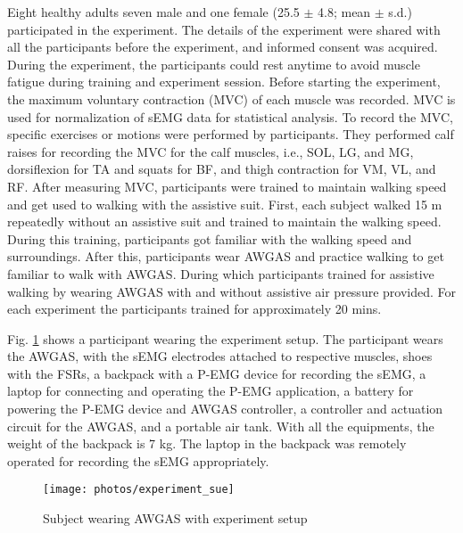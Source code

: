 \documentclass[paper,JRM,paper]{jaciiiarticle}
\begin{document}
Eight healthy adults seven male and one female (25.5 $\pm$ 4.8; mean $\pm$ s.d.) participated in the experiment. The details of the experiment were shared with all the participants before the experiment, and informed consent was acquired. During the experiment, the participants could rest anytime to avoid muscle fatigue during training and experiment session. Before starting the experiment, the maximum voluntary contraction (MVC) of each muscle was recorded. MVC is used for normalization of sEMG data for statistical analysis. To record the MVC, specific exercises or motions were performed by participants. They performed calf raises for recording the MVC for the calf muscles, i.e., SOL, LG, and MG, dorsiflexion for TA and squats for BF, and thigh contraction for VM, VL, and RF. 
After measuring MVC, participants were trained to maintain walking speed and get used to walking with the assistive suit. First, each subject walked 15 m repeatedly without an assistive suit and trained to maintain the walking speed. During this training, participants got familiar with the walking speed and surroundings. After this, participants wear AWGAS and practice walking to get familiar to walk with AWGAS. During which participants trained for assistive walking by wearing AWGAS with and without assistive air pressure provided. For each experiment the participants trained for approximately 20 mins. 



Fig. \ref{fig:experiment} shows a participant wearing the experiment setup. The participant wears the AWGAS, with the sEMG electrodes attached to respective muscles, shoes with the FSRs, a backpack with a P-EMG device for recording the sEMG, a laptop for connecting and operating the P-EMG application, a battery for powering the P-EMG device and AWGAS controller, a controller and actuation circuit for the AWGAS, and a portable air tank. With all the equipments, the weight of the backpack is 7 kg. The laptop in the backpack was remotely operated for recording the sEMG appropriately.


\begin{figure}[h]
	\centering
	\texttt{[image: photos/experiment\_sue]}
	\caption{Subject wearing AWGAS with experiment setup}
	\label{fig:experiment}
\end{figure}
\end{document}
